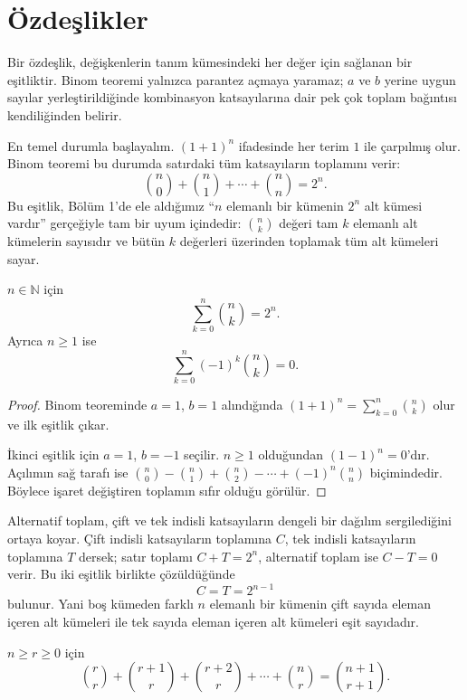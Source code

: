 \section{Özdeşlikler}

Bir özdeşlik, değişkenlerin tanım kümesindeki her değer için sağlanan bir eşitliktir. Binom teoremi yalnızca parantez açmaya yaramaz; $a$ ve $b$ yerine uygun sayılar yerleştirildiğinde kombinasyon katsayılarına dair pek çok toplam bağıntısı kendiliğinden belirir.

En temel durumla başlayalım. $(1+1)^n$ ifadesinde her terim $1$ ile çarpılmış olur. Binom teoremi bu durumda satırdaki tüm katsayıların toplamını verir:
\[
\binom{n}{0}+\binom{n}{1}+\cdots+\binom{n}{n}=2^n.
\]
Bu eşitlik, Bölüm 1'de ele aldığımız ``$n$ elemanlı bir kümenin $2^n$ alt kümesi vardır'' gerçeğiyle tam bir uyum içindedir: $\binom{n}{k}$ değeri tam $k$ elemanlı alt kümelerin sayısıdır ve bütün $k$ değerleri üzerinden toplamak tüm alt kümeleri sayar.

\begin{theorem}
$n\in\mathbb{N}$ için
\[
\sum_{k=0}^{n}\binom{n}{k}=2^n.
\]
Ayrıca $n\ge1$ ise
\[
\sum_{k=0}^{n}(-1)^k\binom{n}{k}=0.
\]
\end{theorem}

\begin{proof}
Binom teoreminde $a=1$, $b=1$ alındığında $(1+1)^n=\sum_{k=0}^{n}\binom{n}{k}$ olur ve ilk eşitlik çıkar.

İkinci eşitlik için $a=1$, $b=-1$ seçilir. $n\ge1$ olduğundan $(1-1)^n=0$'dır. Açılımın sağ tarafı ise $\binom{n}{0}-\binom{n}{1}+\binom{n}{2}-\cdots+(-1)^n\binom{n}{n}$ biçimindedir. Böylece işaret değiştiren toplamın sıfır olduğu görülür.
\end{proof}

Alternatif toplam, çift ve tek indisli katsayıların dengeli bir dağılım sergilediğini ortaya koyar. Çift indisli katsayıların toplamına $C$, tek indisli katsayıların toplamına $T$ dersek; satır toplamı $C+T=2^n$, alternatif toplam ise $C-T=0$ verir. Bu iki eşitlik birlikte çözüldüğünde
\[
C=T=2^{n-1}
\]
bulunur. Yani boş kümeden farklı $n$ elemanlı bir kümenin çift sayıda eleman içeren alt kümeleri ile tek sayıda eleman içeren alt kümeleri eşit sayıdadır.

\begin{theorem}
$n\ge r\ge0$ için
\[
\binom{r}{r}+\binom{r+1}{r}+\binom{r+2}{r}+\cdots+\binom{n}{r}
=\binom{n+1}{r+1}.
\]
\end{theorem}

